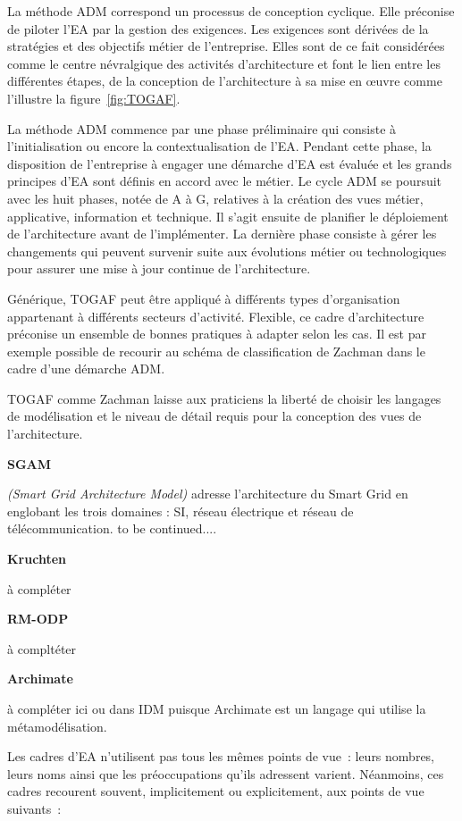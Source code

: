 La méthode ADM correspond un processus de conception cyclique. Elle préconise de piloter l'EA par la gestion des exigences. Les exigences sont dérivées de la stratégies et des objectifs métier de l'entreprise. Elles sont de ce fait considérées comme le centre névralgique des activités d'architecture et font le lien entre les différentes étapes, de la conception de l'architecture à sa mise en œuvre comme l'illustre la figure~\ref{fig:TOGAF}. 

La méthode ADM commence par une phase préliminaire qui consiste à l'initialisation ou encore la contextualisation de l'EA. Pendant cette phase, la disposition de l'entreprise à engager une démarche d'EA est évaluée et les grands principes d'EA sont définis en accord avec le métier. Le cycle ADM se poursuit avec les huit phases, notée de A à G, relatives à la création des vues métier, applicative, information et technique. Il s'agit ensuite de planifier le déploiement de l'architecture avant de l'implémenter. La dernière phase consiste à gérer les changements qui peuvent survenir suite aux évolutions métier ou technologiques pour assurer une mise à jour continue de l'architecture. 

Générique, TOGAF peut être appliqué à différents types d'organisation appartenant à différents secteurs d'activité. Flexible, ce cadre d'architecture préconise  un ensemble de bonnes pratiques à adapter selon les cas. Il est par exemple possible de recourir au schéma de classification de Zachman dans le cadre d'une démarche ADM.

TOGAF comme Zachman laisse aux praticiens la liberté de choisir les langages de modélisation et le niveau de détail requis pour la conception des vues de l'architecture. 

\textbf{SGAM} 

\textit{(Smart Grid Architecture Model)} \cite{uslar2012standardization} adresse l'architecture du Smart Grid en englobant les trois domaines : SI, réseau électrique et réseau de télécommunication.  to be continued....

\textbf{Kruchten}

à compléter

\textbf{RM-ODP}

à compltéter

\textbf{Archimate}

à compléter ici ou dans IDM puisque Archimate est un langage qui utilise la métamodélisation. 


Les cadres d'EA n'utilisent pas tous les mêmes points de vue~: leurs nombres, leurs noms ainsi que les préoccupations qu'ils adressent varient. Néanmoins, ces 
cadres recourent souvent, implicitement ou explicitement, aux points de vue suivants~:

